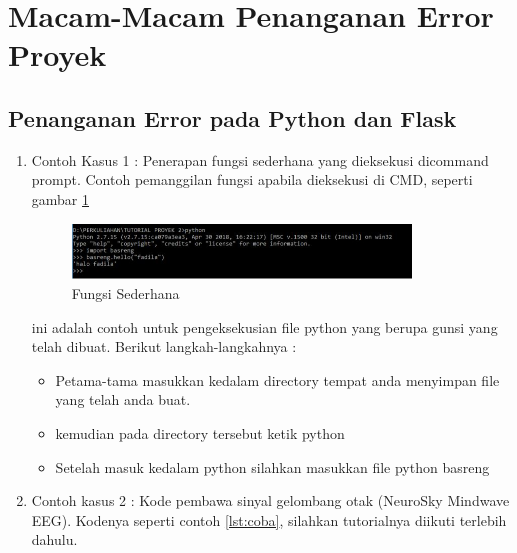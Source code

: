 \section{Macam-Macam Penanganan Error Proyek}
\subsection{Penanganan Error pada Python dan Flask}
\begin{enumerate}
  \item Contoh Kasus 1 : Penerapan fungsi sederhana yang dieksekusi dicommand prompt. Contoh pemanggilan fungsi apabila dieksekusi di CMD, seperti gambar \ref{fig:contohsederhana}

  \begin{figure}[!ht]
        \centerline{\includegraphics[width=0.85\textwidth]{figures/10/contohsederhana.jpg}}
	    \caption{Fungsi Sederhana}
	    \label{fig:contohsederhana}
  \end{figure}

ini adalah contoh untuk pengeksekusian file python yang berupa gunsi yang telah dibuat. Berikut langkah-langkahnya :
    \begin{itemize}
        \item Petama-tama masukkan kedalam directory tempat anda menyimpan file yang telah anda buat.
        \item kemudian pada directory tersebut ketik python
        \item Setelah masuk kedalam python silahkan masukkan file python basreng
    \end{itemize}

  \item Contoh kasus 2 : Kode pembawa sinyal gelombang otak (NeuroSky Mindwave EEG). Kodenya seperti contoh \ref{lst:coba}, silahkan tutorialnya diikuti terlebih dahulu.

\end{enumerate}
